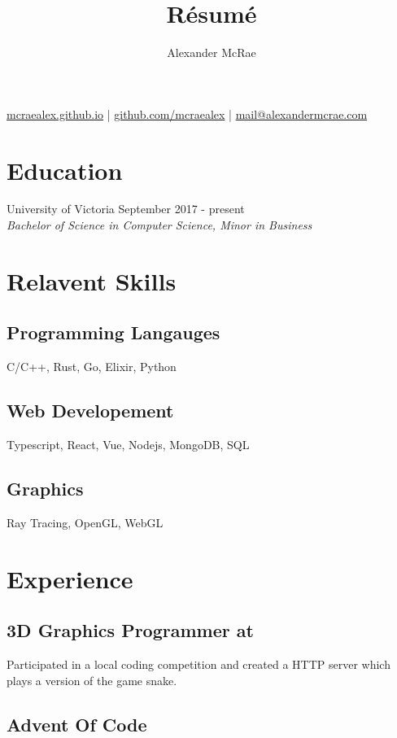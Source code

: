 \documentclass{article}
\makeatletter
\renewcommand{\maketitle}{
\begin{center}
{\huge \bfseries \theauthor}

\vspace{0.25em}
\url{mcraealex.github.io} | \url{github.com/mcraealex} | \href{mailto:mail@alexandermcrae.com}{mail@alexandermcrae.com}
\end{center}}
\newcommand{\hrefColored}[3]{\href{#2}{\color{#1}{#3}}}
\makeatother
\begin{document}
\title{R\'esum\'e}
\author{Alexander McRae}

\maketitle

\section{Education}

\noindent University of Victoria \hfill September 2017 - present\\
\textit{Bachelor of Science in Computer Science, Minor in Business}

\section{Relavent Skills}

\subsection{Programming Langauges}

C/C++, Rust, Go, Elixir, Python

\subsection{Web Developement}

Typescript, React, Vue, Nodejs, MongoDB, SQL

\subsection{Graphics}

Ray Tracing, OpenGL, WebGL

\section{Experience}

\subsection{3D Graphics Programmer at \hrefColored{blue}{https://www.suntrackertech.com}{Suntracker Technologies Ltd.}}

Participated in a local coding competition and created a HTTP server which plays
a version of the game snake.

\subsection{Advent Of Code \hrefColored{blue}{https://github.com/McRaeAlex/AdventOfCode2018}{github.com/McRaeAlex/AdventOfCode2018}}
\end{document}
